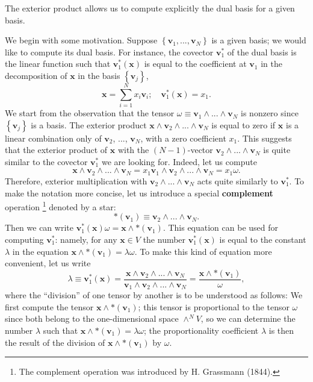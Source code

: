 The exterior product allows us to compute explicitly the dual basis
for a given basis.

We begin with some motivation. Suppose $\left\{ \mathbf{v}_{1},...,\mathbf{v}_{N}\right\} $
is a given basis; we would like to compute its dual basis. For instance,
the covector $\mathbf{v}_{1}^{*}$ of the dual basis is the linear
function such that $\mathbf{v}_{1}^{*}(\mathbf{x})$ is equal to the
coefficient at $\mathbf{v}_{1}$ in the decomposition of $\mathbf{x}$
in the basis $\left\{ \mathbf{v}_{j}\right\} $,\[
\mathbf{x}=\sum_{i=1}^{N}x_{i}\mathbf{v}_{i};\quad\mathbf{v}_{1}^{*}(\mathbf{x})=x_{1}.\]
We start from the observation that the tensor $\omega\equiv\mathbf{v}_{1}\wedge...\wedge\mathbf{v}_{N}$
is nonzero since $\left\{ \mathbf{v}_{j}\right\} $ is a basis. The
exterior product $\mathbf{x}\wedge\mathbf{v}_{2}\wedge...\wedge\mathbf{v}_{N}$
is equal to zero if $\mathbf{x}$ is a linear combination only of
$\mathbf{v}_{2}$, ..., $\mathbf{v}_{N}$, with a zero coefficient
$x_{1}$. This suggests that the exterior product of $\mathbf{x}$
with the $(N-1)$-vector $\mathbf{v}_{2}\wedge...\wedge\mathbf{v}_{N}$
is quite similar to the covector $\mathbf{v}_{1}^{*}$ we are looking
for. Indeed, let us compute\[
\mathbf{x}\wedge\mathbf{v}_{2}\wedge...\wedge\mathbf{v}_{N}=x_{1}\mathbf{v}_{1}\wedge\mathbf{v}_{2}\wedge...\wedge\mathbf{v}_{N}=x_{1}\omega.\]
Therefore, exterior multiplication with $\mathbf{v}_{2}\wedge...\wedge\mathbf{v}_{N}$
acts quite similarly to $\mathbf{v}_{1}^{*}$. To make the notation
more concise, let us introduce a special \textbf{complement}
operation%
\footnote{The complement operation was introduced by H. Grassmann (1844).%
} denoted by a star: \[
*\left(\mathbf{v}_{1}\right)\equiv\mathbf{v}_{2}\wedge...\wedge\mathbf{v}_{N}.\]
Then we can write $\mathbf{v}_{1}^{*}(\mathbf{x})\omega=\mathbf{x}\wedge*(\mathbf{v}_{1})$.
This equation can be used for computing $\mathbf{v}_{1}^{*}$: namely,
for any $\mathbf{x}\in V$ the number $\mathbf{v}_{1}^{*}(\mathbf{x})$
is equal to the constant $\lambda$ in the equation $\mathbf{x}\wedge*(\mathbf{v}_{1})=\lambda\omega$.
To make this kind of equation more convenient, let us write\[
\lambda\equiv\mathbf{v}_{1}^{*}(\mathbf{x})=\frac{\mathbf{x}\wedge\mathbf{v}_{2}\wedge...\wedge\mathbf{v}_{N}}{\mathbf{v}_{1}\wedge\mathbf{v}_{2}\wedge...\wedge\mathbf{v}_{N}}=\frac{\mathbf{x}\wedge*(\mathbf{v}_{1})}{\omega},\]
where the {}``division'' of one tensor
by another is to be understood as follows: We first compute the tensor
$\mathbf{x}\wedge*(\mathbf{v}_{1})$; this tensor is proportional
to the tensor $\omega$ since both belong to the one-dimen\-sion\-al
space $\wedge^{N}V$, so we can determine the number $\lambda$ such
that $\mathbf{x}\wedge*(\mathbf{v}_{1})=\lambda\omega$; the proportionality
coefficient $\lambda$ is then the result of the division of $\mathbf{x}\wedge*(\mathbf{v}_{1})$
by $\omega$.

